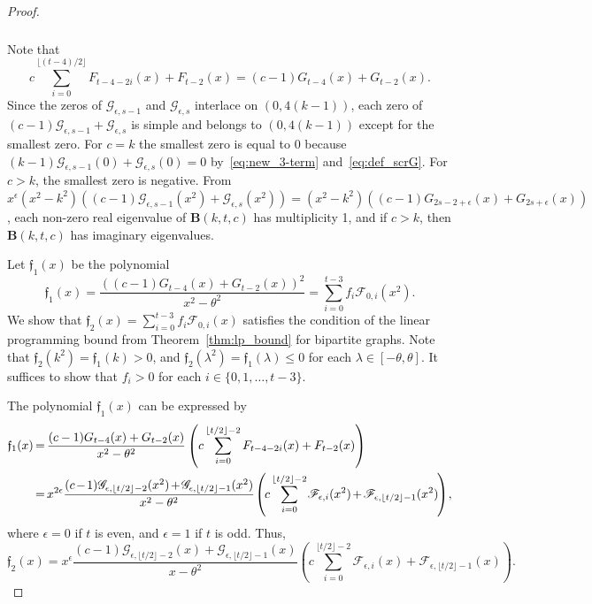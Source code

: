 \documentclass[ALCO,ThmDefs,Unicode,epreuves]{cedram}
\newcommand*{\Mk}{\mkern -2mu}
\begin{document}
\begin{proof}
\begin{multline*}
\begin{aligned}
\end{aligned}
\end{multline*}
Note that
\[
c\sum_{i=0}^{ \lfloor (t-4)/2 \rfloor}F_{t-4-2i}(x)+F_{t-2}(x)=(c-1){G}_{t-4}(x)+{G}_{t-2}(x). 
\]
Since the zeros of $\mathscr{G}_{\epsilon,s-1}$ and $\mathscr{G}_{\epsilon,s}$ interlace on $(0,4(k-1))$, each zero of $(c-1)\mathscr{G}_{\epsilon,s-1}+\mathscr{G}_{\epsilon,s}$ is simple and belongs to $(0,4(k-1))$ except for the smallest zero. 
For $c=k$ the smallest zero is equal to $0$ because 
$
(k-1)\mathscr{G}_{\epsilon,s-1}(0)+\mathscr{G}_{\epsilon,s}(0)=0
$ 
by~\eqref{eq:new_3-term} and~\eqref{eq:def_scrG}. 
For $c>k$, the smallest zero is negative. From $x^{\epsilon}(x^2-k^2)((c-1)\mathscr{G}_{\epsilon,s-1}(x^2)+\mathscr{G}_{\epsilon,s}(x^2))=(x^2-k^2)((c-1){G}_{2s-2+\epsilon}(x)+{G}_{2s+\epsilon}(x))$, 
each non-zero real eigenvalue of 
$\boldsymbol{B}(k,t,c)$ has multiplicity 1, 
and if $c>k$, then $\boldsymbol{B}(k,t,c)$ has 
imaginary eigenvalues. 

Let $\mathfrak{f}_1(x)$ be the polynomial 
\[
\mathfrak{f}_1(x)=\frac{((c-1){G}_{t-4}(x)+G_{t-2}(x))^2}{x^2-\theta^2}=\sum_{i=0}^{ t- 3} f_i \mathscr{F}_{0,i}(x^2).
\]
We show that $\mathfrak{f}_2(x)=\sum_{i=0}^{ t - 3} f_i \mathscr{F}_{0,i}(x)$ satisfies the condition of the linear programming bound from Theorem~\ref{thm:lp_bound} for bipartite graphs. 
Note that $\mathfrak{f}_2(k^2)=\mathfrak{f}_1(k)>0$, and $\mathfrak{f}_2(\lambda^2)=\mathfrak{f}_1(\lambda) \leq 0$ for each $\lambda \in [-\theta, \theta]$. 
It suffices to show that $f_i>0$ for each $i\in \{0,1,\ldots, t- 3\}$. 
 
The polynomial $\mathfrak{f}_1(x)$ can be expressed by 
\begin{align*}
\mathfrak{f}_1(x)&\Mk =\Mk 
\frac{(c-1){G}_{t-4}(x)+{G}_{t-2}(x)}{x^2-\theta^2}
\left(c\sum_{i=0}^{\lfloor t/2 \rfloor-2}{F}_{t-4-2i}(x)+{F}_{t-2}(x) \right)\\
&\Mk =\Mk x^{2\epsilon}
\frac{(c\Mk -\Mk 1)\mathscr{G}_{\epsilon,\lfloor t/2 \rfloor-2 }(x^2)\Mk +\Mk \mathscr{G}_{\epsilon,\lfloor t/2 \rfloor-1 }(x^2)}{x^2-\theta^2}
\Mk \left(\Mk c\sum_{i=0}^{\lfloor t/2 \rfloor-2}\Mk \mathscr{F}_{\epsilon,i}(x^2)\Mk +\Mk 
\mathscr{F}_{\epsilon,\lfloor t/2 \rfloor-1}(x^2)\Mk \right)\Mk , 
\end{align*}
where $\epsilon=0$ if $t$ is even, 
and $\epsilon=1$ if $t$ is odd. Thus, 
\[
\mathfrak{f}_2(x)=x^{\epsilon}
\frac{(c-1)\mathscr{G}_{\epsilon,\lfloor t/2 \rfloor-2 }(x)+\mathscr{G}_{\epsilon,\lfloor t/2 \rfloor-1 }(x)}{x-\theta^2}
\left(c\sum_{i=0}^{\lfloor t/2 \rfloor-2}\mathscr{F}_{\epsilon,i}(x)+
\mathscr{F}_{\epsilon,\lfloor t/2 \rfloor-1}(x)\right).
\]


\end{proof}
\end{document}
